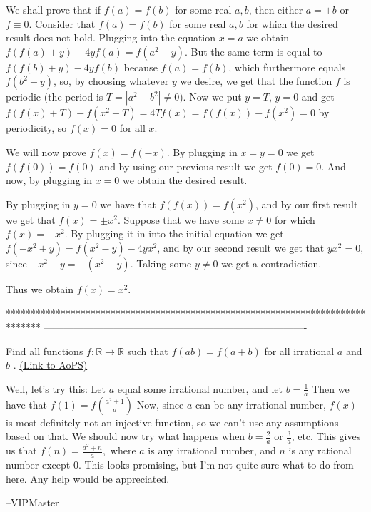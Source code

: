 \begin{solution}
	We shall prove that if $f(a)=f(b)$ for some real $a, b$, then either $a=\pm b$ or $f\equiv 0$.
Consider that $f(a)=f(b)$ for some real $a, b$ for which the desired result does not hold. Plugging into the equation $x=a$ we obtain $f(f(a)+y)-4yf(a)=f(a^2-y)$.
But the same term is equal to $f(f(b)+y)-4yf(b)$ because $f(a)=f(b)$, which furthermore equals $f(b^2-y)$, so, by choosing whatever $y$ we desire, we get that the function $f$ is periodic (the period is $T=|a^2-b^2|\neq 0$).
Now we put $y=T$, $y=0$ and get $f(f(x)+T)-f(x^2-T)=4Tf(x)=f(f(x))-f(x^2)=0$ by periodicity, so $f(x)=0$ for all $x$.

We will now prove $f(x)=f(-x)$. 
By plugging in $x=y=0$ we get $f(f(0))=f(0)$ and by using our previous result we get $f(0)=0$. 
And now, by plugging in $x=0$ we obtain the desired result.

By plugging in $y=0$ we have that $f(f(x))=f(x^2)$, and by our first result we get that $f(x)=\pm x^2$. Suppose that we have some $x\neq 0$ for which $f(x)=-x^2$. By plugging it in into the initial equation we get $f(-x^2+y)=f(x^2-y)-4yx^2$, and by our second result we get that $yx^2=0$, since $-x^2+y=-(x^2-y)$. Taking some $y\neq 0$ we get a contradiction.

Thus we obtain $f(x)=x^2$.
\end{solution}
*******************************************************************************
-------------------------------------------------------------------------------

\begin{problem}
	Find all functions $ f : \mathbb{R} \to \mathbb{R}$ such that $ f(ab)= f(a+b)$ for all irrational $a$ and $b$ .
	\flushright \href{https://artofproblemsolving.com/community/c6h415870}{(Link to AoPS)}
\end{problem}



\begin{solution}
	Well, let's try this:
Let $a$ equal some irrational number, and let $b = \frac{1}{a}$
Then we have that $f(1) = f(\frac{a^2 + 1}{a})$
Now, since $a$ can be any irrational number, $f(x)$ is most definitely not an injective function, so we can't use any assumptions based on that.
We should now try what happens when $b = \frac{2}{a}$ or $\frac{3}{a}$, etc.
This gives us that $f(n) = \frac{a^2 + n}{a},$ where $a$ is any irrational number, and $n$ is any rational number except 0.
This looks promising, but I'm not quite sure what to do from here.
Any help would be appreciated.

--VIPMaster
\end{solution}



